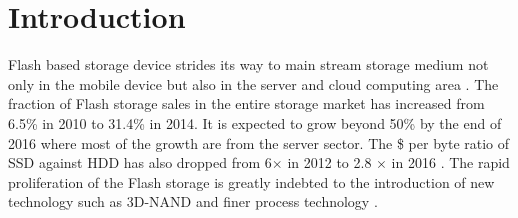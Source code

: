 \documentclass[pageno]{jpaper}
\begin{document}

\section{Introduction}

Flash based storage device strides its way to main stream storage
medium not only in the mobile device but also in the server and cloud
computing area \cite{enterpriseflash2015berry}. The fraction of Flash
storage sales in the entire storage market has increased from 6.5\% in
2010 to 31.4\% in 2014. It is expected to grow beyond 50\% by the end
of 2016 \cite{3dnand_samsung_news} where most of the growth are from
the server sector. The \$ per byte ratio of SSD against HDD has also
dropped from 6$\times$ in 2012 to 2.8 $\times$ in 2016
\cite{ssdprice}. The rapid proliferation of the Flash storage is
greatly indebted to the introduction of new technology such as 3D-NAND
\cite{3dnand_samsung} and finer process technology \cite{davis2013flash}.
\end{document}
